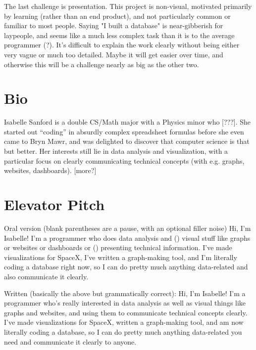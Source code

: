 \documentclass[12pt, oneside]{amsart} %
\begin{document}
The last challenge is presentation. This project is non-visual, motivated primarily by learning (rather than an end product), and not particularly common or familiar to most people. Saying "I built a database" is near-gibberish for laypeople, and seems like a much less complex task than it is to the average programmer (?). It's difficult to explain the work clearly without being either very vague or much too detailed. Maybe it will get easier over time, and otherwise this will be a challenge nearly as big as the other two. 

\section{Bio} Isabelle Sanford is a double CS/Math major with a Physics minor who [???]. She started out ``coding'' in absurdly complex spreadsheet formulas before she even came to Bryn Mawr, and was delighted to discover that computer science is that but better. Her interests still lie in data analysis and visualization, with a particular focus on clearly communicating technical concepts (with e.g. graphs, websites, dashboards). [more?]

\section{Elevator Pitch}
Oral version (blank parentheses are a pause, with an optional filler noise)
Hi, I'm Isabelle! I'm a programmer who does data analysis and () visual stuff like graphs or websites or dashboards or () presenting technical information. I've made visualizations for SpaceX, I've written a graph-making tool, and I'm literally coding a database right now, so I can do pretty much anything data-related and also communicate it clearly. 

Written (basically the above but grammatically correct): 
Hi, I'm Isabelle! I'm a programmer who's really interested in data analysis as well as visual things like graphs and websites, and using them to communicate technical concepts clearly. I've made visualizations for SpaceX, written a graph-making tool, and am now literally coding a database, so I can do pretty much anything data-related you need and communicate it clearly to anyone. 
\end{document}
